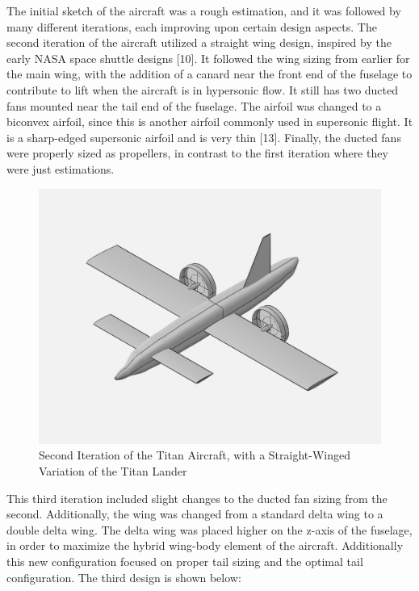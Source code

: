 \documentclass{article}
\begin{document}
The initial sketch of the aircraft was a rough estimation, and it was followed by many different iterations, each improving upon certain design aspects. The second iteration of the aircraft utilized a straight wing design, inspired by the early NASA space shuttle designs [10]. It followed the wing sizing from earlier for the main wing, with the addition of a canard near the front end of the fuselage to contribute to lift when the aircraft is in hypersonic flow. It still has two ducted fans mounted near the tail end of the fuselage. The airfoil was changed to a biconvex airfoil, since this is another airfoil commonly used in supersonic flight. It is a sharp-edged supersonic airfoil and is very thin [13]. Finally, the ducted fans were properly sized as propellers, in contrast to the first iteration where they were just estimations. 

\begin{figure}[H]
 \centering 
    \includegraphics [scale = 0.7]{Figures/TitanLanderStraightWing.png}
    \caption{Second Iteration of the Titan Aircraft, with a Straight-Winged Variation of the Titan Lander}
    \label{fig:TitanLanderStraight}
\end{figure}



This third iteration included slight changes to the ducted fan sizing from the second. Additionally, the wing was changed from a standard delta wing to a double delta wing. The delta wing was placed higher on the z-axis of the fuselage, in order to maximize the hybrid wing-body element of the aircraft. Additionally this new configuration focused on proper tail sizing and the optimal tail configuration. The third design is shown below: 
\end{document}
